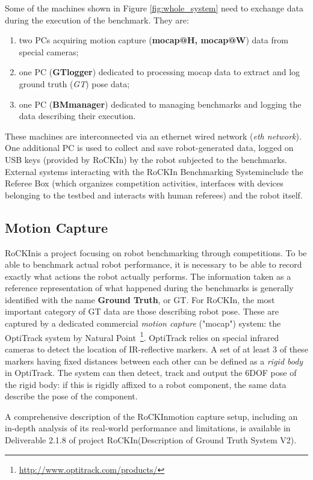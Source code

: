 \documentclass[a4paper]{article}
\newcommand{\ro}{RoCKIn}
\newcommand{\rbs}{RoCKIn Benchmarking System}
\begin{document}
Some of the machines shown in Figure \ref{fig:whole_system} need to exchange data during the execution of the benchmark. They are:
\begin{enumerate}
\item two PCs acquiring motion capture (\textbf{mocap@H, mocap@W}) data from special cameras;
\item one PC (\textbf{GTlogger}) dedicated to processing mocap data to extract and log ground truth (\textit{GT}) pose data;
\item one PC (\textbf{BMmanager}) dedicated to managing benchmarks and logging the data describing their execution.
\end{enumerate}
These machines are interconnected via an ethernet wired network (\textit{eth network}). One additional PC is used to collect and save robot-generated data, logged on USB keys (provided by \ro) by the robot subjected to the benchmarks.
External systems interacting with the \rbs include the Referee Box (which organizes competition activities, interfaces with devices belonging to the testbed and interacts with human referees) and the robot itself.

\subsection{Motion Capture}
\label{sec:mocap}

\ro is a project focusing on robot benchmarking through competitions. To be able to benchmark actual robot performance, it is necessary to be able to record exactly what actions the robot actually performs. The information taken as a reference representation of what happened during the benchmarks is generally identified with the name \textbf{Ground Truth}, or GT. For \ro, the most important category of GT data are those describing robot pose. These are captured by a dedicated commercial \textit{motion capture} ("mocap") system: the OptiTrack system by Natural Point~\footnote{\url{http://www.optitrack.com/products/}}.
OptiTrack relies on special infrared cameras to detect the location of IR-reflective markers. A set of at least 3 of these markers having fixed distances between each other can be defined as a \textit{rigid body} in OptiTrack. The system can then detect, track and output the 6DOF pose of the rigid body: if this is rigidly affixed to a robot component, the same data describe the pose of the component. 

A comprehensive description of the \ro motion capture setup, including an in-depth analysis of its real-world performance and limitations, is available in Deliverable 2.1.8 of project \ro (Description of Ground Truth System V2).
\end{document}
